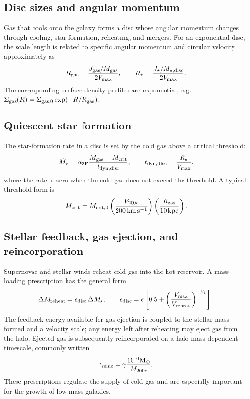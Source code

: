 \documentclass[11pt,a4paper]{article}
\newcommand{\Msun}{\mathrm{M}_{\odot}}
\begin{document}
\subsection{Disc sizes and angular momentum}

Gas that cools onto the galaxy forms a disc whose angular momentum changes through cooling, star formation, reheating, and mergers. For an exponential disc, the scale length is related to specific angular momentum and circular velocity approximately as
\begin{equation}
 R_{\rm gas}=\frac{J_{\rm gas}/M_{\rm gas}}{2V_{\max}},\qquad
 R_{\star}=\frac{J_{\star}/M_{\star,\rm disc}}{2V_{\max}}.
\end{equation}
The corresponding surface-density profiles are exponential, e.g. $\Sigma_{\rm gas}(R)=\Sigma_{\rm gas,0}\exp(-R/R_{\rm gas})$.

\subsection{Quiescent star formation}

The star-formation rate in a disc is set by the cold gas above a critical threshold:
\begin{equation}
 \dot M_{\star}=\alpha_{\rm SF}
 \frac{M_{\rm gas}-M_{\rm crit}}{t_{\rm dyn,disc}},
 \qquad t_{\rm dyn,disc}=\frac{R_{\star}}{V_{\max}},
\end{equation}
where the rate is zero when the cold gas does not exceed the threshold. A typical threshold form is
\begin{equation}
 M_{\rm crit}=M_{\rm crit,0}
 \left(\frac{V_{200c}}{200\,\mathrm{km\,s^{-1}}}\right)
 \left(\frac{R_{\rm gas}}{10\,\mathrm{kpc}}\right).
\end{equation}

\subsection{Stellar feedback, gas ejection, and reincorporation}

Supernovae and stellar winds reheat cold gas into the hot reservoir. A mass-loading prescription has the general form
\begin{equation}
 \Delta M_{\rm reheat}=\epsilon_{\rm disc}\,\Delta M_{\star},\qquad
 \epsilon_{\rm disc}=\epsilon\left[0.5+
 \left(\frac{V_{\max}}{V_{\rm reheat}}\right)^{-\beta_1}\right].
\end{equation}
The feedback energy available for gas ejection is coupled to the stellar mass formed and a velocity scale; any energy left after reheating may eject gas from the halo. Ejected gas is subsequently reincorporated on a halo-mass-dependent timescale, commonly written
\begin{equation}
 t_{\rm reinc}=\gamma\frac{10^{10}\Msun}{M_{200c}}.
\end{equation}
These prescriptions regulate the supply of cold gas and are especially important for the growth of low-mass galaxies.
\end{document}
